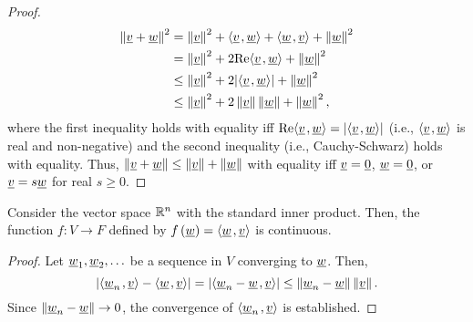 \begin{proof}
\begin{equation*}
\begin{split}
\left\| \underline{v} + \underline{w} \right\|^2
&= \left\| \underline{v} \right\|^2 + {\left\langle  \underline{v}  \mskip2mu ,  \underline{w}  \right\rangle} + {\left\langle  \underline{w}  \mskip2mu ,  \underline{v}  \right\rangle} + \left\| \underline{w} \right\|^2 \\
&= \left\| \underline{v} \right\|^2 + 2 \mathrm{Re} {\left\langle  \underline{v}  \mskip2mu ,  \underline{w}  \right\rangle} + \left\| \underline{w} \right\|^2 \\
&\leq \left\| \underline{v} \right\|^2 + 2 |{\left\langle  \underline{v}  \mskip2mu ,  \underline{w}  \right\rangle}| + \left\| \underline{w} \right\|^2 \\
&\leq \left\| \underline{v} \right\|^2 + 2 \left\| \underline{v} \right\| \left\| \underline{w} \right\| + \left\| \underline{w} \right\|^2 ,
\end{split}
\end{equation*}
where the first inequality holds with equality iff $\mathrm{Re} {\left\langle  \underline{v}  \mskip2mu ,  \underline{w}  \right\rangle} = | {\left\langle  \underline{v}  \mskip2mu ,  \underline{w}  \right\rangle}|$ (i.e., ${\left\langle \underline{v} \mskip2mu , \underline{w} \right\rangle}$ is real and non-negative) and the second inequality (i.e., Cauchy-Schwarz) holds with equality.
Thus, $\left\| \underline{v} + \underline{w} \right\| \leq \left\| \underline{v} \right\| + \left\| \underline{w} \right\|$ with equality iff $\underline{v} = \underline{0}$, $\underline{w}=\underline{0}$, or $\underline{v} = s \underline{w}$ for real $s\geq 0$.
\end{proof}


\begin{theorem}
\label{theorem:InnerProductContinuous}
Consider the vector space $\mathbb{R}^n$ with the standard inner product. %
Then, the function $f \colon V \rightarrow F$ defined by $f \left( \underline{w} \right) = {\left\langle  \underline{w}  \mskip2mu ,  \underline{v}  \right\rangle}$ is continuous.
\end{theorem}
\begin{proof}
Let $\underline{w}_1, \underline{w}_2, \ldots$ be a sequence in $V$ converging to $\underline{w}$.
Then,
\begin{equation*}
\left| {\left\langle  \underline{w}_n  \mskip2mu ,  \underline{v}  \right\rangle}
- {\left\langle  \underline{w}  \mskip2mu ,  \underline{v}  \right\rangle} \right|
= \left| {\left\langle  \underline{w}_n - \underline{w}  \mskip2mu ,  \underline{v}  \right\rangle} \right|
\leq \left\| \underline{w}_n - \underline{w} \right\| \left\| \underline{v} \right\|.
\end{equation*}
Since $\left\| \underline{w}_n - \underline{w} \right\| \rightarrow 0$, the convergence of ${\left\langle  \underline{w}_n  \mskip2mu ,  \underline{v}  \right\rangle}$ is established.
\end{proof}


